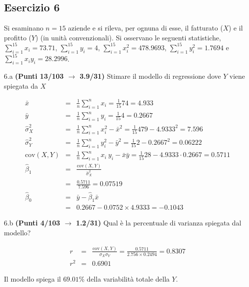 \documentclass[
  11pt,
]{book}
\theoremstyle{mytheoremstyle}
\theoremstyle{mydefstyle}
\newenvironment{sol}
  {
  \begin{tcolorbox}[enhanced,breakable,arc=0.1mm,boxrule=1pt,colback=white,colframe=iblue,
  title=\bf \fontfamily{lmss}\selectfont \hspace{.5 cm} Soluzione,drop fuzzy shadow]

}{
\end{tcolorbox}
  }
\begin{document}
\subsection{Esercizio 6}\label{esercizio-6-7}

Si esaminano \(n=15\) aziende e si rileva, per ognuna di esse, il
fatturato (\(X\)) e il profitto (\(Y\)) (in unità convenzionali).
Si osservano le seguenti statistiche, \(\sum_{i=1}^{15}x_i=73.71\), \(\sum_{i=1}^{15}y_i=4\),
\(\sum_{i=1}^{15}x_i^2=478.9693\), \(\sum_{i=1}^{15}y_i^2=1.7694\) e \(\sum_{i=1}^{15}x_iy_i=28.2996\).

6.a \textbf{(Punti 13/103 \(\rightarrow\) 3.9/31)} Stimare il modello di regressione dove \(Y\) viene spiegata da \(X\)

\begin{sol}
\begin{eqnarray*}
           \bar x &=&\frac 1 n\sum_{i=1}^n x_i = \frac {1}{ 15 }  74 =  4.933 \\
           \bar y &=&\frac 1 n\sum_{i=1}^n y_i = \frac {1}{ 15 }  4 =  0.2667 \\
           \hat\sigma_X^2&=&\frac 1 n\sum_{i=1}^n x_i^2-\bar x^2=\frac {1}{ 15 }  479  - 4.9333 ^2= 7.596 \\
           \hat\sigma_Y^2&=&\frac 1 n\sum_{i=1}^n y_i^2-\bar y^2=\frac {1}{ 15 }  2  - 0.2667 ^2= 0.06222 \\
           \text{cov}(X,Y)&=&\frac 1 n\sum_{i=1}^n x_i~y_i-\bar x\bar y=\frac {1}{ 15 }  28 - 4.9333 \cdot 0.2667 = 0.5711 \\
           \hat\beta_1 &=& \frac{\text{cov}(X,Y)}{\hat\sigma_X^2} \\
                    &=& \frac{ 0.5711 }{ 7.596 }  =  0.07519 \\
           \hat\beta_0 &=& \bar y - \hat\beta_1 \bar x\\
                    &=&  0.2667 - 0.0752 \times  4.9333 = -0.1043 
         \end{eqnarray*}

\end{sol}

6.b \textbf{(Punti 4/103 \(\rightarrow\) 1.2/31)} Qual è la percentuale di varianza spiegata dal modello?

\begin{sol}
\begin{eqnarray*}
r&=&\frac{\text{cov}(X,Y)}{\sigma_X\sigma_Y}=\frac{ 0.5711 }{ 2.756 \times 0.2494 }= 0.8307 \\ 
r^2&=& 0.6901\end{eqnarray*}

Il modello spiega il \(69.01\%\) della variabilità totale della \(Y\).

\end{sol}
\end{document}
